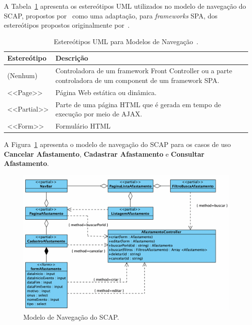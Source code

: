 A Tabela~\ref{tab-estereotipos-navegacao} apresenta os estereótipos UML utilizados no modelo de navegação do SCAP,
propostos por~ como uma adaptação, para \textit{frameworks} SPA,
dos estereótipos propostos originalmente por~.

\begin{table}[h!]
    \centering
    \caption{Estereótipos UML para Modelos de Navegação~\cite{hoppe:2023}.}
    \label{tab-estereotipos-navegacao}
    \begin{tabular}{|p{3cm}|p{12cm}|}
        \hline
        \textbf{Estereótipo} & \textbf{Descrição} \\
        \hline
        (Nenhum)    & Controladora de um framework Front Controller ou a parte controladora de um component de um framework SPA. \\
        \hline
        <<Page>>    & Página Web estática ou dinâmica. \\
        \hline
        <<Partial>> & Parte de uma página HTML que é gerada em tempo de execução por meio de AJAX. \\
        \hline
        <<Form>>    & Formulário HTML \\
        \hline
    \end{tabular}
\end{table}

A Figura~\ref{fig-modelo-navegacao-afast} apresenta o modelo de navegação do SCAP para os casos de uso
\textbf{Cancelar Afastamento}, \textbf{Cadastrar Afastamento} e \textbf{Consultar Afastamento}.

\begin{figure}
    \centering
    \includegraphics[width=1\textwidth]{figuras/fig-modelo-naveg-afast.png}
    \caption{Modelo de Navegação do SCAP.}
    \label{fig-modelo-navegacao-afast}
\end{figure}

